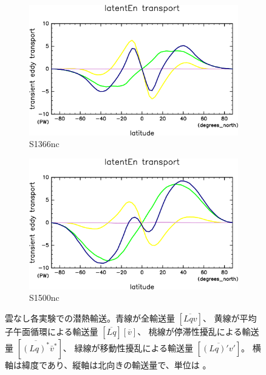 \documentclass[body]{subfiles}
\begin{document}
\begin{figure}[t]
	\centering
	\begin{subfigure}{.4\textwidth}
		\centering
		\includegraphics[width=\textwidth]{S1366-nc/MeriHeatTrans@latentEn,time=3650:4015-crop-rotate.pdf}
		\caption{S1366nc}\label{潜熱S1366nc}
	\end{subfigure}
	\begin{subfigure}{.4\textwidth}
		\centering
		\includegraphics[width=\textwidth]{S1500-nc/MeriHeatTrans@latentEn,time=3650:4015-crop-rotate.pdf}
		\caption{S1500nc}\label{潜熱S1500nc}
	\end{subfigure}
	\caption[雲なし各実験での南北熱輸送量]{
		雲なし各実験での潜熱輸送。青線が全輸送量 \([\overline{Lqv}]\)、
		黄線が平均子午面循環による輸送量 \([\overline{Lq}][\overline{v}]\)、
		桃線が停滞性擾乱による輸送量 \([\overline{(Lq)^*}\bar v^*]\)、
		緑線が移動性擾乱による輸送量 \([\overline{(Lq)'v'}]\)。
		横軸は緯度であり、縦軸は北向きの輸送量で、単位は 。
	}\label{潜熱nc}
\end{figure}
\end{document}

